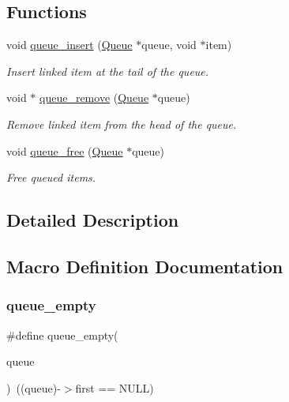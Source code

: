 \subsection*{Functions}
\begin{DoxyCompactItemize}
\item 
void \hyperlink{group__queue_gaaa24b65f3154f21e3ff86ef0722b5c33}{queue\+\_\+insert} (\hyperlink{structQueue}{Queue} $\ast$queue, void $\ast$item)
\begin{DoxyCompactList}\small\item\em Insert linked item at the tail of the queue. \end{DoxyCompactList}\item 
void $\ast$ \hyperlink{group__queue_ga5f39cda20a9848df6e23aada641f5461}{queue\+\_\+remove} (\hyperlink{structQueue}{Queue} $\ast$queue)
\begin{DoxyCompactList}\small\item\em Remove linked item from the head of the queue. \end{DoxyCompactList}\item 
void \hyperlink{group__queue_ga42c7cc8caeb6778234887511db8fba40}{queue\+\_\+free} (\hyperlink{structQueue}{Queue} $\ast$queue)
\begin{DoxyCompactList}\small\item\em Free queued items. \end{DoxyCompactList}\end{DoxyCompactItemize}


\subsection{Detailed Description}


\subsection{Macro Definition Documentation}
\mbox{\label{group__queue_ga3001011f0b018b23ce87b33bbc6438d9}} 
\subsubsection{\texorpdfstring{queue\+\_\+empty}{queue\_empty}}
{\footnotesize\ttfamily \#define queue\+\_\+empty(\begin{DoxyParamCaption}\item[{}]{queue }\end{DoxyParamCaption})~((queue)-\/$>$first == N\+U\+LL)}



